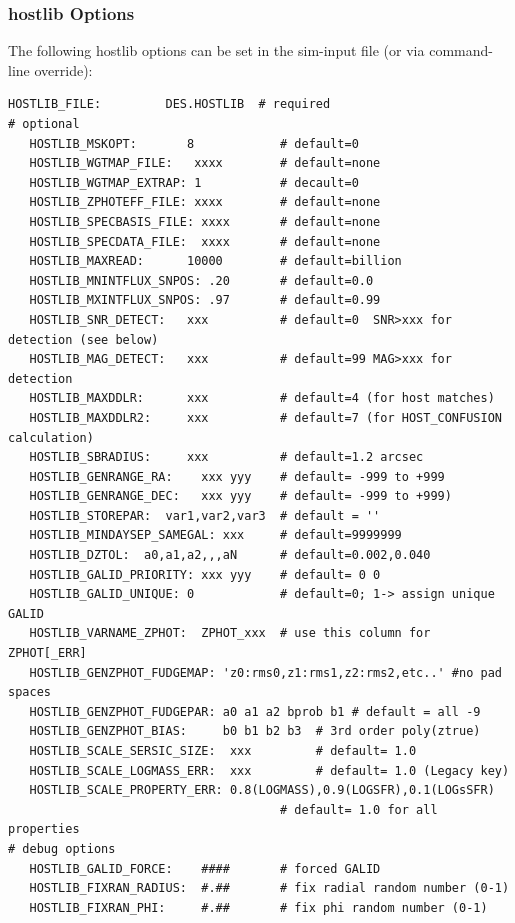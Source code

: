 \documentclass[12pt]{article}
\newcommand{\hostlib}{{\sc hostlib}}
\begin{document}
{%
\clearpage
\subsubsection{{\hostlib} Options}
\label{sss:hostlib_options}

The following {\hostlib} options can be set in
the sim-input file (or via command-line override):
%
\begin{Verbatim}[frame=single]
   HOSTLIB_FILE:         DES.HOSTLIB  # required
# optional
   HOSTLIB_MSKOPT:       8            # default=0
   HOSTLIB_WGTMAP_FILE:   xxxx        # default=none
   HOSTLIB_WGTMAP_EXTRAP: 1           # decault=0
   HOSTLIB_ZPHOTEFF_FILE: xxxx        # default=none
   HOSTLIB_SPECBASIS_FILE: xxxx       # default=none
   HOSTLIB_SPECDATA_FILE:  xxxx       # default=none
   HOSTLIB_MAXREAD:      10000        # default=billion
   HOSTLIB_MNINTFLUX_SNPOS: .20       # default=0.0
   HOSTLIB_MXINTFLUX_SNPOS: .97       # default=0.99
   HOSTLIB_SNR_DETECT:   xxx          # default=0  SNR>xxx for detection (see below)
   HOSTLIB_MAG_DETECT:   xxx          # default=99 MAG>xxx for detection
   HOSTLIB_MAXDDLR:      xxx          # default=4 (for host matches)
   HOSTLIB_MAXDDLR2:     xxx          # default=7 (for HOST_CONFUSION calculation)
   HOSTLIB_SBRADIUS:     xxx          # default=1.2 arcsec
   HOSTLIB_GENRANGE_RA:    xxx yyy    # default= -999 to +999
   HOSTLIB_GENRANGE_DEC:   xxx yyy    # default= -999 to +999)   
   HOSTLIB_STOREPAR:  var1,var2,var3  # default = ''
   HOSTLIB_MINDAYSEP_SAMEGAL: xxx     # default=9999999
   HOSTLIB_DZTOL:  a0,a1,a2,,,aN      # default=0.002,0.040
   HOSTLIB_GALID_PRIORITY: xxx yyy    # default= 0 0 
   HOSTLIB_GALID_UNIQUE: 0            # default=0; 1-> assign unique GALID
   HOSTLIB_VARNAME_ZPHOT:  ZPHOT_xxx  # use this column for ZPHOT[_ERR]
   HOSTLIB_GENZPHOT_FUDGEMAP: 'z0:rms0,z1:rms1,z2:rms2,etc..' #no pad spaces
   HOSTLIB_GENZPHOT_FUDGEPAR: a0 a1 a2 bprob b1 # default = all -9
   HOSTLIB_GENZPHOT_BIAS:     b0 b1 b2 b3  # 3rd order poly(ztrue)
   HOSTLIB_SCALE_SERSIC_SIZE:  xxx         # default= 1.0
   HOSTLIB_SCALE_LOGMASS_ERR:  xxx         # default= 1.0 (Legacy key)
   HOSTLIB_SCALE_PROPERTY_ERR: 0.8(LOGMASS),0.9(LOGSFR),0.1(LOGsSFR)   
                                      # default= 1.0 for all properties
# debug options
   HOSTLIB_GALID_FORCE:    ####       # forced GALID 
   HOSTLIB_FIXRAN_RADIUS:  #.##       # fix radial random number (0-1)
   HOSTLIB_FIXRAN_PHI:     #.##       # fix phi random number (0-1)

\end{Verbatim}}
\end{document}
